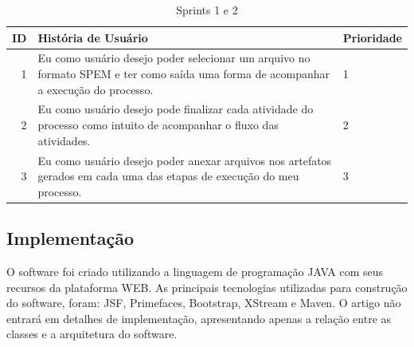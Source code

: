 
		

\begin{table}[!htb]

	\centering
	\caption{Sprints 1 e 2}
		\label{sprint2}
	\vspace{0.5cm}
	\begin{tabular}{r|p{11cm}|p{2cm}}
		
		ID & História de Usuário & Prioridade \\ %
		\hline                               %
		1 & Eu como usuário desejo poder selecionar um arquivo no formato SPEM e ter como saída uma forma de acompanhar a execução do processo.        & 1 \\
		\hline     
		2 & Eu como usuário desejo pode finalizar cada atividade do processo como intuito de acompanhar o fluxo das atividades.  & 2 \\
		\hline 
		3 & Eu como usuário desejo poder anexar arquivos nos artefatos gerados em cada uma das etapas de execução do meu processo.           & 3 
	\end{tabular}
\end{table}

\subsection{Implementação}\label{ferramentaImplementacao}
O software foi criado utilizando a linguagem de programação JAVA com seus recursos da plataforma WEB. As principais tecnologias utilizadas para construção do software, foram: JSF, Primefaces, Bootstrap, XStream e Maven. O artigo não entrará em detalhes de implementação, apresentando apenas a relação entre as classes e a arquitetura do software.


